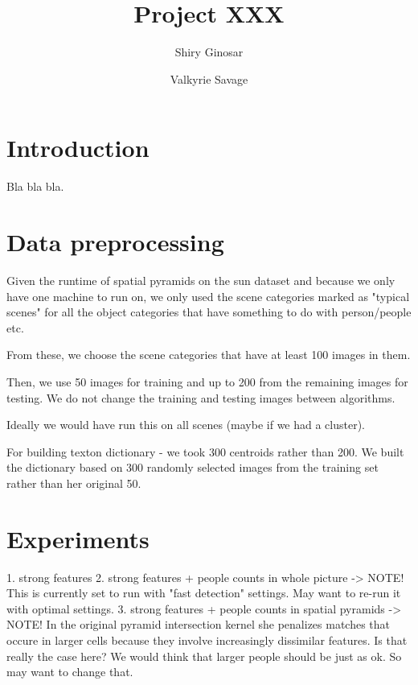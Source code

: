 \documentclass[11pt]{article}
\begin{document}
\title{Project XXX}
\author{Shiry Ginosar \and Valkyrie Savage}

\maketitle


\section{Introduction}
Bla bla bla.

\section{Data preprocessing}
Given the runtime of spatial pyramids on the sun dataset and because we only have one machine to run on, we only used the scene categories marked as "typical scenes" for all the object categories that have something to do with person/people etc.

From these, we choose the scene categories that have at least 100 images in them.

Then, we use 50 images for training and up to 200 from the remaining images for testing. We do not change the training and testing images between algorithms.

Ideally we would have run this on all scenes (maybe if we had a cluster).

For building texton dictionary - we took 300 centroids rather than 200. We built the dictionary based on 300 randomly selected images from the training set rather than her original 50.

\section{Experiments}
1. strong features
2. strong features + people counts in whole picture -> NOTE! This is currently set to run with "fast detection" settings. May want to re-run it with optimal settings.
3. strong features + people counts in spatial pyramids -> NOTE! In the original pyramid intersection kernel she penalizes matches that occure in larger cells because they involve increasingly dissimilar features. Is that really the case here? We would think that larger people should be just as ok. So may want to change that.



\end{document}
